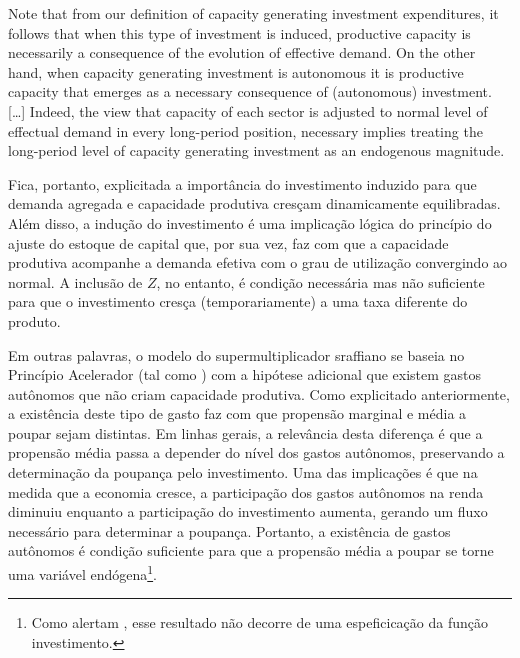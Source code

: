 \begin{citacao}
Note that from our definition of capacity generating investment expenditures, it follows that when this type of investment is induced, productive capacity is necessarily a consequence of the evolution of effective demand. On the other hand, when capacity generating investment is autonomous it is productive capacity that emerges as a necessary consequence of (autonomous) investment. […] Indeed, the view that capacity of each sector is adjusted to normal level of effectual demand in every long-period position, necessary implies treating the long-period level of capacity generating investment as an endogenous magnitude. \cite[p.~77]{serrano_sraffian_1995}
\end{citacao}
Fica, portanto, explicitada a importância do investimento induzido para que demanda agregada e capacidade produtiva cresçam dinamicamente equilibradas. Além disso, a indução do investimento é uma implicação lógica do princípio do ajuste do estoque de capital que, por sua vez, faz com que a capacidade produtiva acompanhe a demanda efetiva com o grau de utilização convergindo ao normal. A inclusão de $Z$, no entanto, é condição necessária mas não suficiente para que o investimento cresça (temporariamente) a uma taxa diferente do produto.

Em outras palavras, o modelo do supermultiplicador sraffiano se baseia no Princípio Acelerador (tal como \textcite{harrod_essay_1939}) com a hipótese adicional que existem gastos autônomos que não criam capacidade produtiva. Como explicitado anteriormente, a existência deste tipo de gasto faz com que propensão marginal e média a poupar sejam distintas. Em linhas gerais, a relevância desta diferença é que a propensão média passa a depender do nível dos gastos autônomos, preservando a determinação da poupança pelo investimento.  Uma das implicações é que na medida que a economia cresce, a participação dos gastos autônomos na renda diminuiu enquanto a participação do investimento aumenta, gerando um fluxo necessário para determinar a poupança. Portanto, a existência de gastos autônomos é condição suficiente para que a propensão média a poupar se torne uma variável endógena\footnote{Como alertam \textcite{serrano_sraffian_2017}, esse resultado não decorre de uma espeficicação da função investimento.}.

